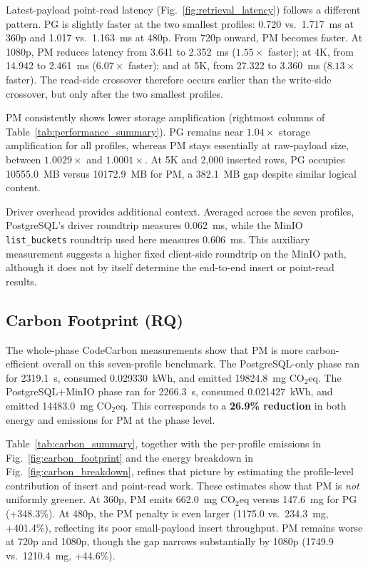 \documentclass[conference]{IEEEtran}
\begin{document}
Latest-payload point-read latency (Fig.~\ref{fig:retrieval_latency}) follows a different pattern. PG is slightly faster at the two smallest profiles: 0.720 vs.\ 1.717~ms at 360p and 1.017 vs.\ 1.163~ms at 480p. From 720p onward, PM becomes faster. At 1080p, PM reduces latency from 3.641 to 2.352~ms ($1.55\times$ faster); at 4K, from 14.942 to 2.461~ms ($6.07\times$ faster); and at 5K, from 27.322 to 3.360~ms ($8.13\times$ faster). The read-side crossover therefore occurs earlier than the write-side crossover, but only after the two smallest profiles.

PM consistently shows lower storage amplification (rightmost columns of Table~\ref{tab:performance_summary}). PG remains near $1.04\times$ storage amplification for all profiles, whereas PM stays essentially at raw-payload size, between $1.0029\times$ and $1.0001\times$. At 5K and 2,000 inserted rows, PG occupies 10555.0~MB versus 10172.9~MB for PM, a 382.1~MB gap despite similar logical content.

Driver overhead provides additional context. Averaged across the seven profiles, PostgreSQL's driver roundtrip measures 0.062~ms, while the MinIO \texttt{list\_buckets} roundtrip used here measures 0.606~ms. This auxiliary measurement suggests a higher fixed client-side roundtrip on the MinIO path, although it does not by itself determine the end-to-end insert or point-read results.

\subsection{Carbon Footprint (RQ)}
\label{subsec:carbon_footprint}
The whole-phase CodeCarbon measurements show that PM is more carbon-efficient overall on this seven-profile benchmark. The PostgreSQL-only phase ran for 2319.1~s, consumed 0.029330~kWh, and emitted 19824.8~mg CO$_2$eq. The PostgreSQL+MinIO phase ran for 2266.3~s, consumed 0.021427~kWh, and emitted 14483.0~mg CO$_2$eq. This corresponds to a \textbf{26.9\% reduction} in both energy and emissions for PM at the phase level.

Table~\ref{tab:carbon_summary}, together with the per-profile emissions in Fig.~\ref{fig:carbon_footprint} and the energy breakdown in Fig.~\ref{fig:carbon_breakdown}, refines that picture by estimating the profile-level contribution of insert and point-read work. These estimates show that PM is \emph{not} uniformly greener. At 360p, PM emits 662.0~mg CO$_2$eq versus 147.6~mg for PG (+348.3\%). At 480p, the PM penalty is even larger (1175.0 vs.\ 234.3~mg, +401.4\%), reflecting its poor small-payload insert throughput. PM remains worse at 720p and 1080p, though the gap narrows substantially by 1080p (1749.9 vs.\ 1210.4~mg, +44.6\%).
\end{document}
